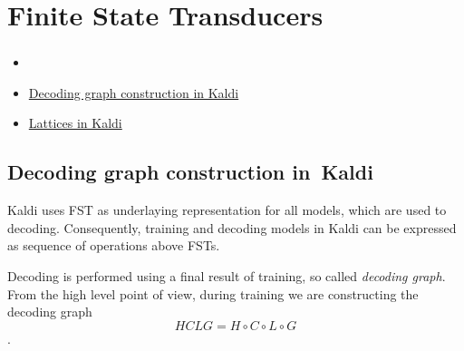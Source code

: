 {









\section{Finite State Transducers} 
\label{sec:fst}



\subsubsection*{} %

\begin{itemize}
    \item {}
    \item \href{http://kaldi.sourceforge.net/graph.html} {Decoding graph construction in Kaldi}
    \item \href{http://kaldi.sourceforge.net/lattices.html} {Lattices in Kaldi}
\end{itemize}

\subsection{Decoding graph construction in~Kaldi} %
Kaldi uses \ac{FST} as underlaying representation for all models, which are used to decoding. Consequently, 
training and decoding models in Kaldi can be expressed as sequence of operations above \acp{FST}.

Decoding is performed using a final result of training, so called {\it decoding graph}. 
From the high level point of view,
during training we are constructing the decoding graph 
\begin{equation} \label{eq:hclg}
HCLG = H\circ C\circ L\circ G
\end{equation}.

}
